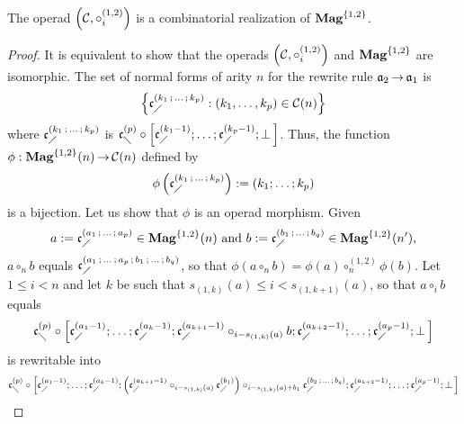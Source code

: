 \begin{Proposition} \label{prop:Realisation_Mag_1_2}
    The operad $\left(\mathcal{C}, \circ_i^{(1,2)}\right)$ is a
    combinatorial realization of $\mathbf{Mag}^{\{1, 2\}}$.
\end{Proposition}
\begin{proof}
  It is equivalent to show that the operads
  $\left(\mathcal{C}, \circ_i^{(1,2)}\right)$ and $\mathbf{Mag}^{\{1, 2\}}$
  are
  isomorphic. The set of normal forms of arity $n$ for the rewrite rule
  $\mathfrak{a}_2 \operatorname{\to} \mathfrak{a}_1$ is
  \begin{equation} \label{equ:Normal_forms_A2}
    \left\{ \mathfrak{c}^{\left(k_1 \, ; \, \dots \, ; \, k_p\right)}_{\diagup} :
    \left(k_1, \dots, k_p\right) \in \mathcal{C}(n) \right\}
  \end{equation}
  where $\mathfrak{c}^{\left(k_1 \, ; \, \dots \, ; \, k_p\right)}_{\diagup}$ is
  $\mathfrak{c}^{\left(p\right)}_{\diagdown} \circ \left[\mathfrak{c}^{\left(k_1-1\right)}_{\diagup}; \dots ; \mathfrak{c}^{\left(k_p-1\right)}_{\diagup}
  ; \perp \, \right]$.
  Thus, the function
  $\phi : \mathbf{Mag}^{\{1, 2\}}(n) \operatorname{\to} \mathcal{C}(n)$ defined by
  \begin{equation} \label{equ:Morphism_A2}
    \phi\left( \mathfrak{c}^{\left(k_1 \, ; \, \dots \, ; \, k_p\right)}_{\diagup} \right) :=
    \left(k_1 ; \dots ; k_p  \right)
  \end{equation}
  is a bijection. Let us show that $\phi$ is an operad morphism. Given
  \begin{equation}
    a := \mathfrak{c}^{\left(a_1 \, ; \, \dots \, ; \, a_p\right)}_{\diagup} \in \mathbf{Mag}^{\{1, 2\}}(n)
    \text{ and }
    b := \mathfrak{c}^{\left(b_1 \, ; \, \dots \, ; \, b_q\right)}_{\diagup} \in \mathbf{Mag}^{\{1, 2\}}(n'),
  \end{equation}
  $a \circ_n b$ equals $\mathfrak{c}^{\left(a_1 \, ; \, \dots \, ; \, a_p
   \, ; \, b_1 \, ; \, \dots \, ; \, b_q\right)}_{\diagup}$, so that
  $\phi\left(a \circ_n b\right) = \phi\left(a\right) \circ_n^{(1,2)}
  \phi\left(b\right)$. Let $1 \leq i < n$ and let $k$ be such that
  $s_{(1, k)}(a) \leq i < s_{(1, k+1)}(a)$, so that $a \circ_i b$ equals
  \begin{equation} \label{equ:Rewriting_1_Mag_1_2}
    \mathfrak{c}^{\left(p\right)}_{\diagdown} \circ \left[\mathfrak{c}^{\left(a_1-1\right)}_{\diagup}; \dots ; \mathfrak{c}^{\left(a_k-1\right)}_{\diagup};
    \mathfrak{c}^{\left(a_{k+1}-1\right)}_{\diagup}
    \circ_{i-s_{(1,k)}(a)} b ; \mathfrak{c}^{\left(a_{k+2}-1\right)}_{\diagup} ; \dots; \mathfrak{c}^{\left(a_p-1\right)}_{\diagup};
    \perp \, \right]
  \end{equation}
  is rewritable into
  \begin{equation}
    \RComb{p} \circ \left[\LComb{a_1-1}; \dots ; \LComb{a_k-1}; \left(
    \LComb{a_{k+1}-1} \circ_{i-s_{(1,k)}(a)}  \LComb{b_1} \right)
    \circ_{i-s_{(1,k)}(a)+b_1} \LComb{b_2 \, ; \, \dots \, ; \, b_q} ;
    \LComb{a_{k+2}-1} ; \dots; \LComb{a_p-1} ; \Leaf \, \right]

\end{equation}
\end{proof}
